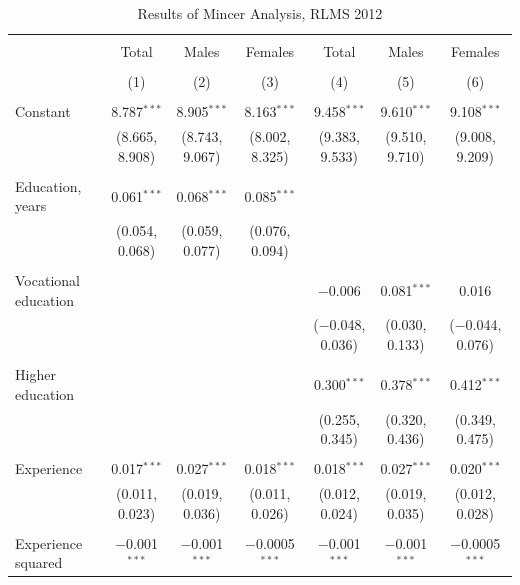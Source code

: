 \documentclass[alpha-refs]{wiley-article-01g}
\begin{document}
\begin{landscape}
	
	\fontsize{9}{11}
	\selectfont
	
	\begin{table}[!htbp] \centering 
\renewcommand{\arraystretch}{1.0}
		\caption{Results of Mincer Analysis, RLMS 2012} 
		\label{} 
		\begin{tabular}{@{\extracolsep{5pt}}lcccccc} 
			\\[-.8ex]\hline 
			\hline \\[-.8ex] 
			& Total & Males & Females & Total & Males & Females \\ 
			\\[-.8ex] & (1) & (2) & (3) & (4) & (5) & (6)\\ 
			\hline \\[-.8ex] 
			Constant & 8.787$^{***}$ & 8.905$^{***}$ & 8.163$^{***}$ & 9.458$^{***}$ & 9.610$^{***}$ & 9.108$^{***}$ \\ 
			& (8.665, 8.908) & (8.743, 9.067) & (8.002, 8.325) & (9.383, 9.533) & (9.510, 9.710) & (9.008, 9.209) \\ 
			& & & & & & \\ 
			Education, years & 0.061$^{***}$ & 0.068$^{***}$ & 0.085$^{***}$ &  &  &  \\ 
			& (0.054, 0.068) & (0.059, 0.077) & (0.076, 0.094) &  &  &  \\ 
			& & & & & & \\ 
			Vocational education &  &  &  & $-$0.006 & 0.081$^{***}$ & 0.016 \\ 
			&  &  &  & ($-$0.048, 0.036) & (0.030, 0.133) & ($-$0.044, 0.076) \\ 
			& & & & & & \\ 
			Higher education &  &  &  & 0.300$^{***}$ & 0.378$^{***}$ & 0.412$^{***}$ \\ 
			&  &  &  & (0.255, 0.345) & (0.320, 0.436) & (0.349, 0.475) \\ 
			& & & & & & \\ 
			Experience & 0.017$^{***}$ & 0.027$^{***}$ & 0.018$^{***}$ & 0.018$^{***}$ & 0.027$^{***}$ & 0.020$^{***}$ \\ 
			& (0.011, 0.023) & (0.019, 0.036) & (0.011, 0.026) & (0.012, 0.024) & (0.019, 0.035) & (0.012, 0.028) \\ 
			& & & & & & \\ 
			Experience squared & $-$0.001$^{***}$ & $-$0.001$^{***}$ & $-$0.0005$^{***}$ & $-$0.001$^{***}$ & $-$0.001$^{***}$ & $-$0.0005$^{***}$ \\ 

\end{tabular}
\end{table}
\end{landscape}
\end{document}
